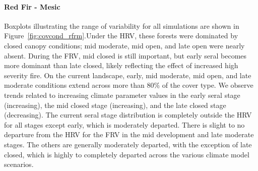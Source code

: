\paragraph{Red Fir - Mesic} 
Boxplots illustrating the range of variability for all simulations are shown in Figure~\ref{fig:covcond_rfrm}.Under the HRV, these forests were dominated by closed canopy conditions; mid moderate, mid open, and late open were nearly absent. During the FRV, mid closed is still important, but early seral becomes more dominant than late closed, likely reflecting the effect of increased high severity fire. On the current landscape, early, mid moderate, mid open, and late moderate conditions extend across more than 80\% of the cover type. We observe trends related to increasing climate parameter values in the early seral stage (increasing), the mid closed stage (increasing), and the late closed stage (decreasing). The current seral stage distribution is completely outside the HRV for all stages except early, which is moderately departed. There is slight to no departure from the HRV for the FRV in the mid development and late moderate stages. The others are generally moderately departed, with the exception of late closed, which is highly to completely departed across the various climate model scenarios.


